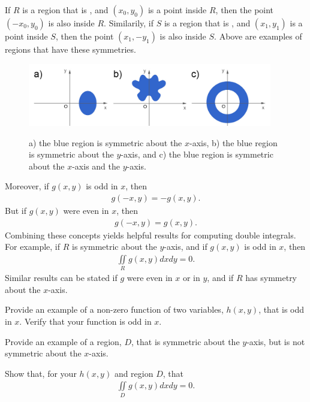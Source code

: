 \documentclass{article}
\begin{document}
If $R$ is a region that is , and $(x_0,y_0)$ is a point inside $R$, then the point $(-x_0,y_0)$ is also inside $R$. Similarily, if $S$ is a region that is , and $(x_1,y_1)$ is a point inside $S$, then the point $(x_1,-y_1)$ is also inside $S$. Above are examples of regions that have these symmetries.\\

\begin{figure}[h]
  \vspace{-1pt}
  \begin{center}
    \includegraphics[width=0.95\textwidth]{ImgRegions.jpg}
  \end{center}
 \begin{quote} \caption{\small{a) the blue region is symmetric about the $x$-axis, b) the blue region is symmetric about the $y$-axis, and c) the blue region is symmetric about the $x$-axis and the $y$-axis.}}\end{quote}
\end{figure}

Moreover, if $g(x,y)$ is odd in $x$, then 
\begin{align*}
  g(-x,y) = - g(x,y).
\end{align*}
But if $g(x,y)$ were even in $x$, then 
\begin{align*}
  g(-x,y) =  g(x,y).
\end{align*}
Combining these concepts yields helpful results for computing double integrals. For example, if $R$ is symmetric about the $y$-axis, and if $g(x,y)$ is odd in $x$, then
\begin{align*}
  \iint\limits_R g(x,y) dxdy = 0.
\end{align*}
Similar results can be stated if $g$ were even in $x$ or in $y$, and if $R$ has symmetry about the $x$-axis. 
\BEN
\item Provide an example of a non-zero function of two variables, $h(x,y)$, that is odd in $x$. Verify that your function is odd in $x$.
\item Provide an example of a region, $D$, that is symmetric about the $y$-axis, but is not symmetric about the $x$-axis. 
\item Show that, for your $h(x,y)$ and region $D$, that 
\begin{align*}
  \iint\limits_D g(x,y) dxdy = 0.
\end{align*}
\EEN
\end{document}
